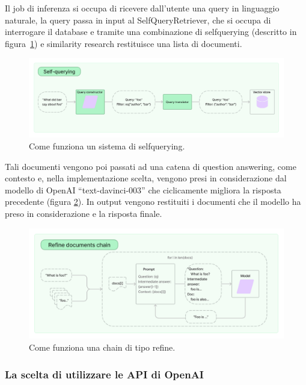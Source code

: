 Il job di inferenza si occupa di ricevere dall'utente una query in linguaggio naturale, la query passa in input al SelfQueryRetriever, 
che si occupa di interrogare il database e tramite una combinazione di selfquerying (descritto in figura~\ref{fig:selfquery}) e similarity research restituisce una lista di documenti.
\begin{figure}[H]
    \centering
    \includegraphics[width=0.7\pdfpagewidth]{images/selfquery.jpg}
    \caption[Ingestion]{Come funziona un sistema di selfquerying.}
    \label{fig:selfquery}
\end{figure}

Tali documenti vengono poi passati ad una catena di question answering, come contesto e, nella implementazione scelta, vengono presi in considerazione dal modello di OpenAI ``text-davinci-003'' che ciclicamente migliora la risposta precedente (figura \ref{fig:refine}).
In output vengono restituiti i documenti che il modello ha preso in considerazione e la risposta finale.

\begin{figure}[H]
    \centering
    \includegraphics[width=0.7\pdfpagewidth]{images/refine.jpg}
    \caption[Ingestion]{Come funziona una chain di tipo refine.}
    \label{fig:refine}
\end{figure}

\subsubsection{La scelta di utilizzare le API di OpenAI}

